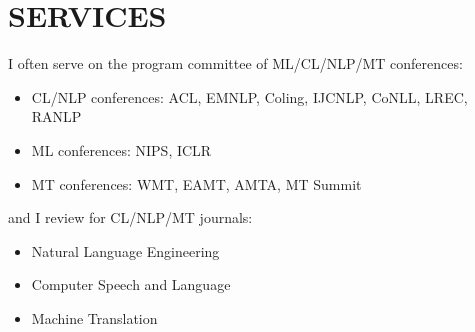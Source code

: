 

\section*{SERVICES}

I often serve on the program committee of ML/CL/NLP/MT conferences:
\begin{itemize}
	\item CL/NLP conferences: ACL, EMNLP, Coling, IJCNLP, CoNLL, LREC, RANLP
	\item ML conferences: NIPS, ICLR
	\item MT conferences: WMT, EAMT, AMTA, MT Summit
\end{itemize}
and I review for CL/NLP/MT journals:
\begin{itemize}
	\item Natural Language Engineering
	\item Computer Speech and Language
	\item Machine Translation
\end{itemize}

